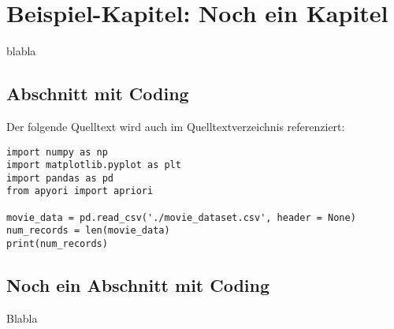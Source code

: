 \chapter{Beispiel-Kapitel: Noch ein Kapitel}

blabla


        
\section{Abschnitt mit Coding}

Der folgende Quelltext wird auch im Quelltextverzeichnis referenziert:

\begin{lstlisting}[caption={\texttt{PrintMovieDB.py}},captionpos=b]
import numpy as np  
import matplotlib.pyplot as plt  
import pandas as pd  
from apyori import apriori

movie_data = pd.read_csv('./movie_dataset.csv', header = None)
num_records = len(movie_data)
print(num_records)
\end{lstlisting}

\section{Noch ein Abschnitt mit Coding}
Blabla

